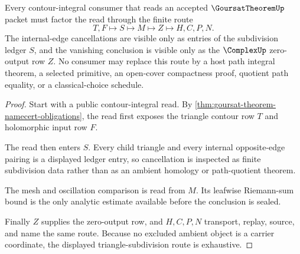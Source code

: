 \begin{theorem}
\label{thm:goursat-theorem-triangle-subdivision-route}
Every contour-integral consumer that reads an accepted $\GoursatTheoremUp$ packet must factor the read through the finite route
$$
T,F \longmapsto S \longmapsto M \longmapsto Z \longmapsto H,C,P,N .
$$
The internal-edge cancellations are visible only as entries of the subdivision ledger $S$, and the vanishing conclusion is visible only as the $\ComplexUp$ zero-output row $Z$. No consumer may replace this route by a host path integral theorem, a selected primitive, an open-cover compactness proof, quotient path equality, or a classical-choice schedule.
\end{theorem}
\begin{proof}
Start with a public contour-integral read. By \autoref{thm:goursat-theorem-namecert-obligations}, the read first exposes the triangle contour row $T$ and holomorphic input row $F$.

The read then enters $S$. Every child triangle and every internal opposite-edge pairing is a displayed ledger entry, so cancellation is inspected as finite subdivision data rather than as an ambient homology or path-quotient theorem.

The mesh and oscillation comparison is read from $M$. Its leafwise Riemann-sum bound is the only analytic estimate available before the conclusion is sealed.

Finally $Z$ supplies the zero-output row, and $H,C,P,N$ transport, replay, source, and name the same route. Because no excluded ambient object is a carrier coordinate, the displayed triangle-subdivision route is exhaustive.
\end{proof}




